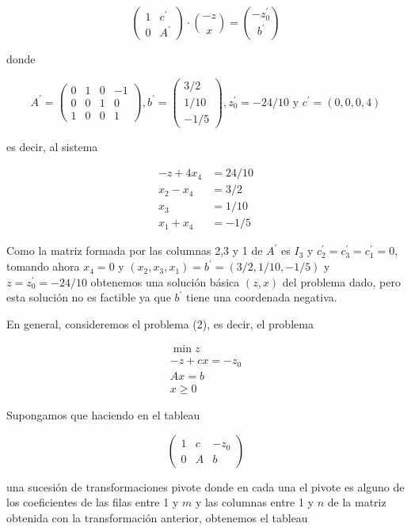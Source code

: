 \documentclass[10pt]{article}
\begin{document}
$$
\left(\begin{array}{cc}
1 & c^{\prime} \\
0 & A^{\prime}
\end{array}\right) \cdot\binom{-z}{x}=\binom{-z_{0}^{\prime}}{b^{\prime}}
$$

donde

$$
A^{\prime}=\left(\begin{array}{cccc}
0 & 1 & 0 & -1 \\
0 & 0 & 1 & 0 \\
1 & 0 & 0 & 1
\end{array}\right), b^{\prime}=\left(\begin{array}{c}
3 / 2 \\
1 / 10 \\
-1 / 5
\end{array}\right), z_{0}^{\prime}=-24 / 10 \text { y } c^{\prime}=(0,0,0,4)
$$

es decir, al sistema

$$
\begin{aligned}
-z+4 x_{4} & =24 / 10 \\
x_{2}-x_{4} & =3 / 2 \\
x_{3} & =1 / 10 \\
x_{1}+x_{4} & =-1 / 5
\end{aligned}
$$

Como la matriz formada por las columnas 2,3 y 1 de $A^{\prime}$ es $I_{3}$ y $c_{2}^{\prime}=c_{3}^{\prime}=c_{1}^{\prime}=0$, tomando ahora $x_{4}=0$ y $\left(x_{2}, x_{3}, x_{1}\right)=b^{\prime}=(3 / 2,1 / 10,-1 / 5)$ y $z=z_{0}^{\prime}=-24 / 10$ obtenemos una solución básica $(z, x)$ del problema dado, pero esta solución no es factible ya que $b^{\prime}$ tiene una coordenada negativa.

En general, consideremos el problema (2), es decir, el problema


\begin{gather*}
\min z \\
-z+c x=-z_{0} \\
A x=b  \tag{2}\\
x \geq 0
\end{gather*}


Supongamos que haciendo en el tableau

$$
\left(\begin{array}{cc|c}
1 & c & -z_{0} \\
0 & A & b
\end{array}\right)
$$

una sucesión de transformaciones pivote donde en cada una el pivote es alguno de los coeficientes de las filas entre 1 y $m$ y las columnas entre 1 y $n$ de la matriz obtenida con la transformación anterior, obtenemos el tableau
\end{document}
